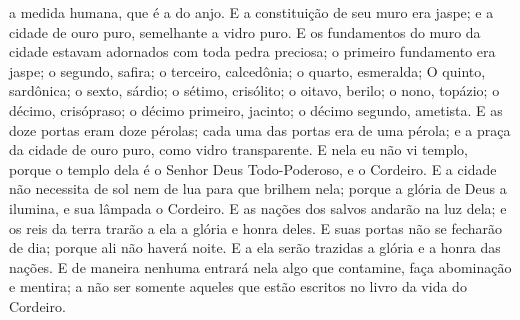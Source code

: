 {{} a medida humana, que é
{} a do anjo.
  E a constituição de seu muro era
{} jaspe; e a cidade
{} de ouro puro, semelhante a vidro puro.
  E os fundamentos do muro da cidade estavam adornados com toda pedra preciosa; o primeiro fundamento era jaspe; o segundo, safira; o terceiro, calcedônia; o quarto, esmeralda;
  O quinto, sardônica; o sexto, sárdio; o sétimo, crisólito; o oitavo, berilo; o nono, topázio; o décimo, crisópraso; o décimo primeiro, jacinto; o décimo segundo, ametista.
  E as doze portas eram doze pérolas; cada uma das portas era de uma pérola; e a praça da cidade
{} de ouro puro, como vidro transparente.
  E nela eu não vi templo, porque o templo dela é o Senhor Deus Todo-Poderoso, e o Cordeiro.
  E a cidade não necessita de sol nem de lua para que brilhem nela; porque a glória de Deus a ilumina, e sua lâmpada
{} o Cordeiro.
  E as nações dos salvos andarão na luz dela; e os reis da terra trarão a ela a glória e honra deles.
  E suas portas não se fecharão de dia; porque ali não haverá noite.
  E a ela serão trazidas a glória e a honra das nações.
  E de maneira nenhuma entrará nela algo que contamine, faça abominação e mentira; a não ser somente aqueles que estão escritos no livro da vida do Cordeiro.
\par }

